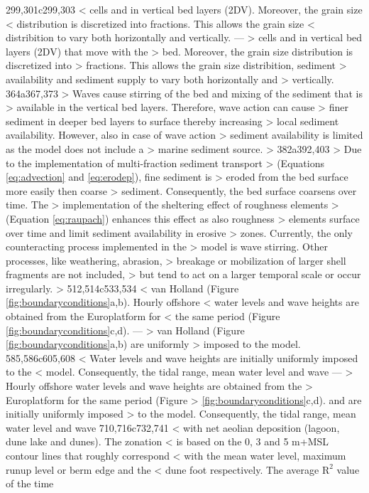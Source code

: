 299,301c299,303
< cells and in vertical bed layers (2DV). Moreover, the grain size
< distribution is discretized into fractions. This allows the grain size
< distribition to vary both horizontally and vertically.
---
> cells and in vertical bed layers (2DV) that move with the
> bed. Moreover, the grain size distribution is discretized into
> fractions. This allows the grain size distribition, sediment
> availability and sediment supply to vary both horizontally and
> vertically.
364a367,373
> Waves cause stirring of the bed and mixing of the sediment that is
> available in the vertical bed layers. Therefore, wave action can cause
> finer sediment in deeper bed layers to surface thereby increasing
> local sediment availability. However, also in case of wave action
> sediment availability is limited as the model does not include a
> marine sediment source.
> 
382a392,403
> Due to the implementation of multi-fraction sediment transport
> (Equations \ref{eq:advection} and \ref{eq:erodep}), fine sediment is
> eroded from the bed surface more easily then coarse
> sediment. Consequently, the bed surface coarsens over time. The
> implementation of the sheltering effect of roughness elements
> (Equation \ref{eq:raupach}) enhances this effect as also roughness
> elements surface over time and limit sediment availability in erosive
> zones. Currently, the only counteracting process implemented in the
> model is wave stirring. Other processes, like weathering, abrasion,
> breakage or mobilization of larger shell fragments are not included,
> but tend to act on a larger temporal scale or occur irregularly.
> 
512,514c533,534
< van Holland (Figure \ref{fig:boundaryconditions}a,b). Hourly offshore
< water levels and wave heights are obtained from the Europlatform for
< the same period (Figure \ref{fig:boundaryconditions}c,d).
---
> van Holland (Figure \ref{fig:boundaryconditions}a,b) are uniformly
> imposed to the model.
585,586c605,608
< Water levels and wave heights are initially uniformly imposed to the
< model. Consequently, the tidal range, mean water level and wave
---
> Hourly offshore water levels and wave heights are obtained from the
> Europlatform for the same period (Figure
> \ref{fig:boundaryconditions}c,d).  and are initially uniformly imposed
> to the model. Consequently, the tidal range, mean water level and wave
710,716c732,741
< with net aeolian deposition (lagoon, dune lake and dunes). The zonation
< is based on the 0, 3 and 5 m+MSL contour lines that roughly correspond
< with the mean water level, maximum runup level or berm edge and the
< dune foot respectively. The average $\mathrm{R^2}$ value of the time
